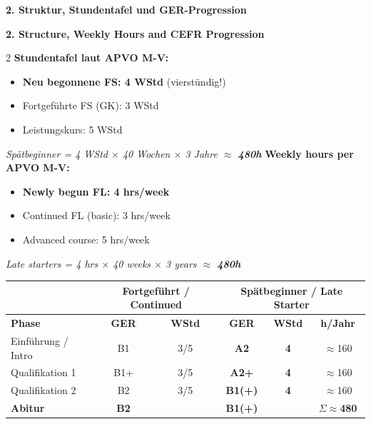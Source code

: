 \documentclass[10pt,a4paper]{article}
\newcommand{\secbil}[2]{%
\vspace{6pt}
\noindent\colorbox{spaet}{\parbox{0.48\textwidth}{\color{white}\bfseries\small #1}}%
\hfill%
\colorbox{english}{\parbox{0.48\textwidth}{\color{white}\bfseries\small #2}}
\vspace{3pt}
}
\begin{document}
\secbil{2. Struktur, Stundentafel und GER-Progression}{2. Structure, Weekly Hours and CEFR Progression}

\vspace{2mm}

\begin{paracol}{2}
\scriptsize
\textbf{Stundentafel laut APVO M-V:}\footnotemark[3]
\begin{itemize}[noitemsep,topsep=2pt]
\item \textbf{Neu begonnene FS: 4 WStd} (vierstündig!)
\item Fortgeführte FS (GK): 3 WStd
\item Leistungskurs: 5 WStd
\end{itemize}
\textit{Spätbeginner = 4 WStd $\times$ 40 Wochen $\times$ 3 Jahre $\approx$ \textbf{480h}}
\switchcolumn
\scriptsize\color{english}
\textbf{Weekly hours per APVO M-V:}\footnotemark[3]
\begin{itemize}[noitemsep,topsep=2pt]
\item \textbf{Newly begun FL: 4 hrs/week}
\item Continued FL (basic): 3 hrs/week
\item Advanced course: 5 hrs/week
\end{itemize}
\textit{Late starters = 4 hrs $\times$ 40 weeks $\times$ 3 years $\approx$ \textbf{480h}}
\end{paracol}

\vspace{2mm}

\begin{center}
\small
\begin{tabular}{|l|c|c|c|c|c|}
\hline
\rowcolor{lightgray}
& \multicolumn{2}{c|}{\textbf{Fortgeführt / Continued}} & \multicolumn{3}{c|}{\textbf{Spätbeginner / Late Starter}} \\
\hline
\rowcolor{lightgray}
\textbf{Phase} & \textbf{GER} & \textbf{WStd} & \textbf{GER} & \textbf{WStd} & \textbf{h/Jahr} \\
\hline
Einführung / Intro & B1 & 3/5 & \textcolor{spaet}{\textbf{A2}} & \textcolor{spaet}{\textbf{4}} & $\approx$160 \\
\hline
Qualifikation 1 & B1+ & 3/5 & \textcolor{spaet}{\textbf{A2+}} & \textcolor{spaet}{\textbf{4}} & $\approx$160 \\
\hline
Qualifikation 2 & B2 & 3/5 & \textcolor{spaet}{\textbf{B1(+)}} & \textcolor{spaet}{\textbf{4}} & $\approx$160 \\
\hline
\textbf{Abitur} & \textbf{B2} & & \textcolor{spaet}{\textbf{B1(+)}} & & $\Sigma\approx$\textbf{480} \\
\hline
\end{tabular}
\end{center}
\end{document}
